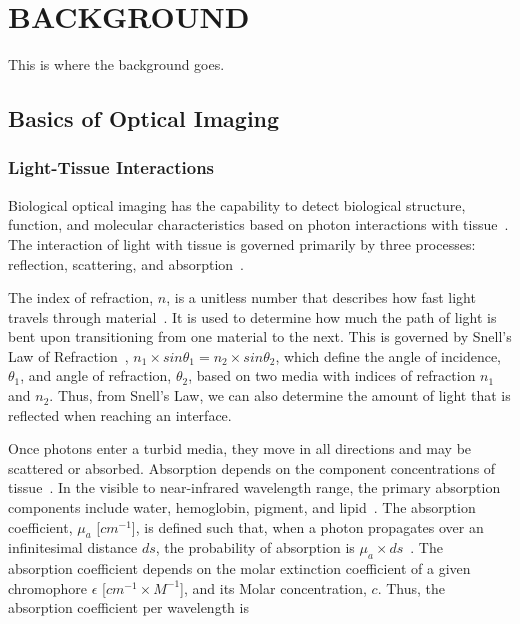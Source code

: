 
\chapter{BACKGROUND} %
\label{chap:background}
This is where the background goes. 



\section{Basics of Optical Imaging}
\label{chap:background:basics}

\subsection{Light-Tissue Interactions}
Biological optical imaging has the capability to detect biological structure, function, and molecular characteristics based on photon interactions with tissue~\cite{Wang2009}. The interaction of light with tissue is governed primarily by three processes: reflection, scattering, and absorption~\cite{Welch2010}. 

The index of refraction, $n$, is a unitless number that describes how fast light travels through material~\cite{Wang2009}. It is used to determine how much the path of light is bent upon transitioning from one material to the next.  This is governed by Snell’s Law of Refraction~\cite{Wang2009}, $n_1 \times sin\theta_1= n_2\times sin\theta_2$, which define the angle of incidence, $\theta_1$, and angle of refraction, $\theta_2$, based on two media with indices of refraction $n_1$ and $n_2$. Thus, from Snell’s Law, we can also determine the amount of light that is reflected when reaching an interface. 

Once photons enter a turbid media, they move in all directions and may be scattered or absorbed. Absorption depends on the component concentrations of tissue~\cite{Nunez2018}. In the visible to near-infrared wavelength range, the primary absorption components include water, hemoglobin, pigment, and lipid~\cite{Du2006, Pogue2006}. The absorption coefficient, $\mu_a$ [$cm^{-1}$], is defined such that, when a photon propagates over an infinitesimal distance $ds$, the probability of absorption is $\mu_a\times ds$~\cite{Welch2010}. The absorption coefficient depends on the molar extinction coefficient of a given chromophore $\epsilon$ [$cm^{-1}\times M^{-1}$], and its Molar concentration, $c$. Thus, the absorption coefficient per wavelength is 

